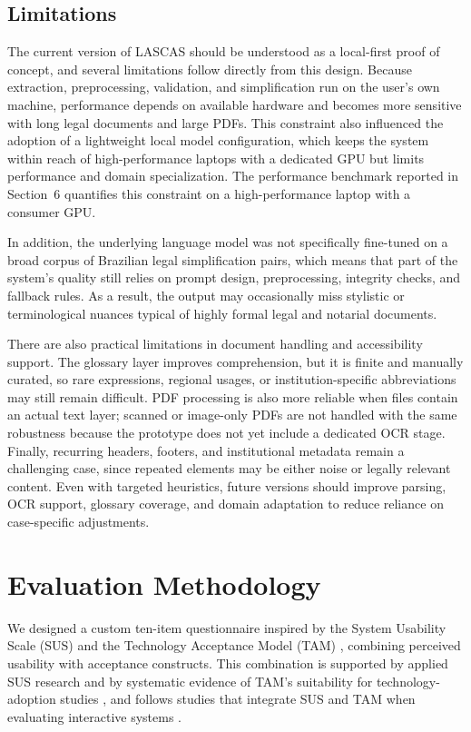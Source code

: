 \documentclass[english]{UNISINOSartigo} %
\begin{document}
\subsection{Limitations}

The current version of LASCAS should be understood as a local-first proof of concept, and several limitations follow directly from this design. Because extraction, preprocessing, validation, and simplification run on the user’s own machine, performance depends on available hardware and becomes more sensitive with long legal documents and large PDFs. This constraint also influenced the adoption of a lightweight local model configuration, which keeps the system within reach of high-performance laptops with a dedicated GPU but limits performance and domain specialization. The performance benchmark reported in Section~6 quantifies this constraint on a high-performance laptop with a consumer GPU.

In addition, the underlying language model was not specifically fine-tuned on a broad corpus of Brazilian legal simplification pairs, which means that part of the system’s quality still relies on prompt design, preprocessing, integrity checks, and fallback rules. As a result, the output may occasionally miss stylistic or terminological nuances typical of highly formal legal and notarial documents.

There are also practical limitations in document handling and accessibility support. The glossary layer improves comprehension, but it is finite and manually curated, so rare expressions, regional usages, or institution-specific abbreviations may still remain difficult. PDF processing is also more reliable when files contain an actual text layer; scanned or image-only PDFs are not handled with the same robustness because the prototype does not yet include a dedicated OCR stage. Finally, recurring headers, footers, and institutional metadata remain a challenging case, since repeated elements may be either noise or legally relevant content. Even with targeted heuristics, future versions should improve parsing, OCR support, glossary coverage, and domain adaptation to reduce reliance on case-specific adjustments.

\section{Evaluation Methodology}

We designed a custom ten-item questionnaire inspired by the System Usability Scale (SUS) \cite{brooke1996sus} and the Technology Acceptance Model (TAM) \cite{davis1989tam}, combining perceived usability with acceptance constructs. This combination is supported by applied SUS research and by systematic evidence of TAM's suitability for technology-adoption studies \cite{hyzy2022susbench, rosli2022tamreview}, and follows studies that integrate SUS and TAM when evaluating interactive systems \cite{chuenyindee2022integrating}.
\end{document}
